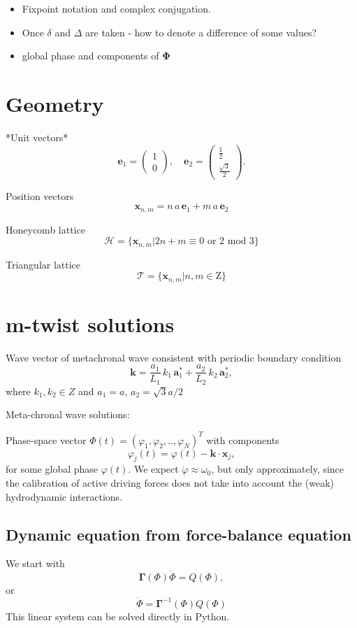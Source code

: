 \documentclass[a4paper,12pt]{article}
\newcommand{\D}{\Delta}%
\begin{document}
\begin{itemize}

\item Fixpoint notation and complex conjugation.
\item Once $\delta$ and $\D$ are taken - how to denote a difference of some values?
\item global phase and components of $\mathbf{\Phi}$
\end{itemize}


\section{Geometry}

*Unit vectors*
$$
\mathbf{e}_1 =\left( \begin{array}{c} 1 \\ 0 \end{array} \right), \quad
\mathbf{e}_2 =\left( \begin{array}{c} \frac{1}{2} \\  \frac{\sqrt{3}}{2} \end{array} \right).
$$

Position vectors
$$
\mathbf{x}_{n,m} = n\,a\,\mathbf{e}_1 +  m\,a\,\mathbf{e}_2
$$

Honeycomb lattice
$$
\mathcal{H} = \{ \mathbf{x}_{n,m} | 2n+m \equiv 0 \text{ or } 2 \text{ mod } 3\}
$$

Triangular lattice
$$
\mathcal{T} = \{ \mathbf{x}_{n,m} | n,m \in \mathrm{Z} \}
$$

\section{m-twist solutions}

Wave vector of metachronal wave consistent with periodic boundary condition
$$ \mathbf{k} = \frac{a_1}{L_1}\,k_1\,\mathbf{a}_1^* + \frac{a_2}{L_2}\,k_2\,\mathbf{a}_2^*, $$
where $k_1,k_2\in{Z}$ and $a_1=a$, $a_2 = \sqrt{3} a/2$

Meta-chronal wave solutions:

Phase-space vector
$ \Phi (t) = (\varphi_1, \varphi_2, .., \varphi_{N})^T $
with components
$$
\varphi_j(t) = \varphi(t) - \mathbf{k} \cdot \mathbf{x}_j,
$$
for some global phase $\varphi(t)$.
We expect $\dot{\varphi}\approx\omega_0$, but only approximately, since the calibration of active driving forces does not take into account the (weak) hydrodynamic interactions.

\subsection{Dynamic equation from force-balance equation}
We start with
$$  \mathbf{\Gamma}(\Phi) \dot{\Phi} =Q(\Phi),$$
or
$$ \dot{\Phi} = \mathbf{\Gamma}^{-1}(\Phi)Q(\Phi)  $$
This linear system can be solved directly in Python.
\end{document}
